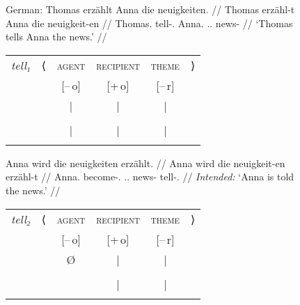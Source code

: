 \begin{figure}
\pex\label{ex:gerditrpass}%
German:
\a\label{ex:gerditrpass_act}%
\begingl
	\gla Thomas erzählt Anna die neuigkeiten. //
	\glb Thomas erzähl-t Anna die neuigkeit-en //
	\glc Thomas.\Nom{} tell-\Tsg{}.\Prs{} Anna.\Dat{} \Def{}.\Acc{}.\Pl{}
		news-\Pl{} //
	\glft `Thomas tells Anna the news.' //
\endgl
\medskip\\
\begin{tabular}[t]{@{} >{\itshape}l l c c c r}
tell₁
	& ⟨
	& \textsc{agent}
	& \textsc{recipient}
	& \textsc{theme}
	& ⟩
	\\
%
	& %
	& [–\,o]
	& [+\,o]
	& [–\,r]
	& %
	\\

%
	& %
	& |
	& |
	& |
	& %
	\\

%
	& %
	& \Subj
	& \SObj
	& \Obj
	& %
	\\

%
	& %
	& |
	& |
	& |
	& %
	\\

%
	& %
	& \fw{Thomas}
	& \fw{Anna}
	& \fw{news}
	& %
	\\
\end{tabular}

\a\label{ex:gerditrpass_pass1}%
\ljudge*\begingl
	\gla Anna wird die neuigkeiten erzählt. //
	\glb Anna wird die neuigkeit-en erzähl-t //
	\glc Anna.\Nom{} become-\Tsg{}.\Prs{} \Def{}.\Acc{}.\Pl{} news-\Pl{}
		tell-\Pst{}.\Ptcp{} //
	\glft \textit{Intended:} `Anna is told the news.' //
\endgl
\medskip\\
\begin{tabular}[t]{@{} >{\itshape}l l c c c r}
tell₂
	& ⟨
	& \textsc{agent}
	& \textsc{recipient}
	& \textsc{theme}
	& ⟩
	\\
%
	& %
	& [–\,o]
	& [+\,o]
	& [–\,r]
	& %
	\\

%
	& %
	& Ø
	& |
	& |
	& %
	\\

%
	& %
	& %
	& \Subj
	& \Obj
	& %
	\\

%
	& %
	& %
	& |
	& |
	& %
	\\

%
	& %
	& %
	& \fw{Anna}
	& \fw{news}
	& %
	\\
\end{tabular}


\end{figure}
